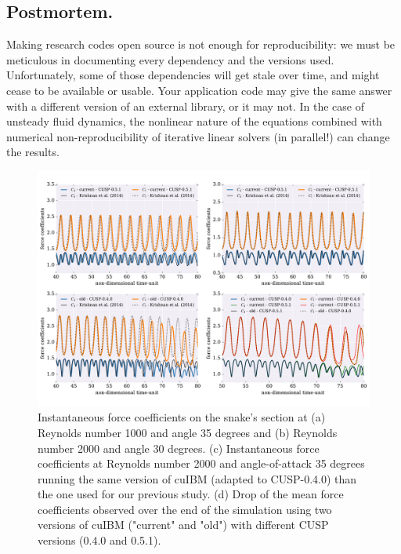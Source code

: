 \documentclass[9pt,twocolumn,twoside]{article}
\begin{document}
\subsection*{Postmortem.} 
Making research codes open source is not enough for reproducibility: we must be meticulous in documenting every dependency and the versions used. 
Unfortunately, some of those dependencies will get stale over time, and might cease to be available or usable. 
Your application code may give the same answer with a different version of an external library, or it may not. 
In the case of unsteady fluid dynamics, the nonlinear nature of the equations combined with numerical non-reproducibility of iterative linear solvers (in parallel!) can change the results. 

\begin{figure}[t]
\centering
\includegraphics[width=1.0\textwidth]{./figures/cuibm/cuibm_forceCoefficients.pdf}
\caption{
Instantaneous force coefficients on the snake's section at (a) Reynolds number 1000 and angle 35 degrees and (b) Reynolds number 2000 and angle 30 degrees.
(c) Instantaneous force coefficients at Reynolds number 2000 and angle-of-attack 35 degrees running the same version of cuIBM (adapted to CUSP-0.4.0) than the one used for our previous study.
(d) Drop of the mean force coefficients observed over the end of the simulation using two versions of cuIBM ("current" and "old") with different CUSP versions (0.4.0 and 0.5.1).
}
\label{figure11}
\end{figure}
\end{document}
